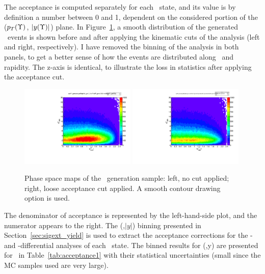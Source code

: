 The acceptance is computed separately for each \PgU\ state, and its value
is by definition a number between 0 and 1, dependent on the
considered portion of the ($p_{T}(\Upsilon)$, $\vert y(\Upsilon)\vert$) plane. In
Figure~\ref{fig:fineBins}, a smooth distribution of the generated
\PgUa\ events is shown before and after applying the kinematic cuts of
the analysis (left and right, respectively). I have removed the
binning of the analysis in both panels, to get a better sense of how
the events are distributed along \pt\ and rapidity. The z-axis is
identical, to illustrate the loss in
statistics after applying the acceptance cut.
\begin{figure}[h]
\begin{centering}  
  \includegraphics[width=0.49\textwidth]{Chapters/aCorrection/simple_yPt.pdf}
  \includegraphics[width=0.49\textwidth]{Chapters/aCorrection/Acc_yPt.pdf}
  \caption{Phase space maps of the \PgUa\ generation sample: left, no
    cut applied; right, loose acceptance cut applied. A smooth
    contour drawing option is used.}
  \label{fig:fineBins} 
\end{centering}  
\end{figure}


The denominator of acceptance is represented by the
left-hand-side plot, and the numerator appears to the right.
The (\pt,$\vert y\vert$) binning presented in
Section~\ref{sec:sigext_yield} is used to extract the acceptance
corrections for the \pt- and \y-differential analyses of each \PgU\
state. The binned results for \acc(\pt,y) are presented for \PgUa\ in Table~\ref{tab:acceptance1} with
their statistical uncertainties (small since the MC
samples used are very large).



